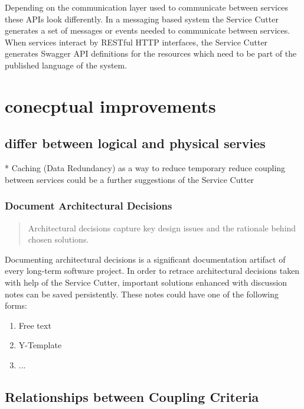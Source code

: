 Depending on the communication layer used to communicate between services these APIs look differently. In a messaging based system the Service Cutter generates a set of messages or events needed to communicate between services. When services interact by RESTful HTTP interfaces, the Service Cutter generates Swagger\cite{swagger} API definitions for the resources which need to be part of the published language\cite[p.375]{evans2003domain} of the system. 


\section{conecptual improvements}

\subsection{differ between logical and physical servies}

* Caching (Data Redundancy) as a way to reduce temporary reduce coupling between services could be a further suggestions of the Service Cutter

\subsubsection{Document Architectural Decisions}

\begin{quote}
	Architectural decisions capture key design issues and the rationale behind chosen solutions.\cite{zioAD}
\end{quote}

Documenting architectural decisions is a significant documentation artifact of every long-term software project. In order to retrace architectural decisions taken with help of the Service Cutter, important solutions enhanced with discussion notes can be saved persistently. These notes could have one of the following forms:

\begin{enumerate}
	\item Free text
	\item Y-Template\cite{zimmermann2012yTemplate}
	\item ... %
\end{enumerate}

\subsection{Relationships between Coupling Criteria}

